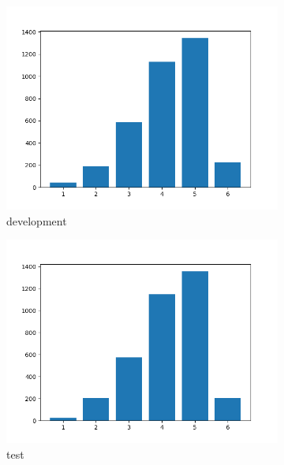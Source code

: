 \documentclass{report}
\begin{document}
\begin{figure}[h!]
	\begin{subfigure}{.33\textwidth}
	\centering
	\includegraphics[width=1\linewidth]{img/dev_ratings}
	\caption{development}
	\label{fig:devratings}
	\end{subfigure}%
	\begin{subfigure}{.33\textwidth}	
	\centering
	\includegraphics[width=1\linewidth]{img/test_ratings}
	\caption{test}
	\label{fig:testratings}
	\end{subfigure}%
	\begin{subfigure}{.33\textwidth}
	\centering

\end{subfigure}
\end{figure}
\end{document}
